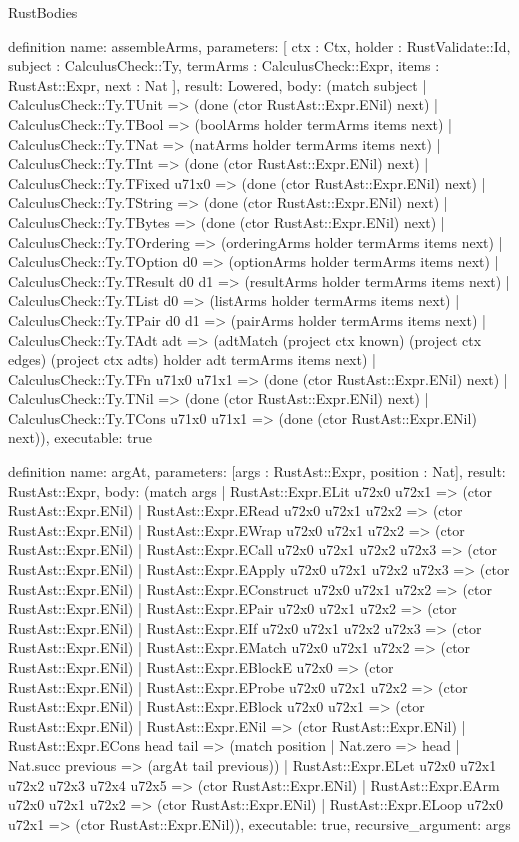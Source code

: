 \begin{lexlean}{RustBodies}
\begin{semanticmodule}
definition{
  name: assembleArms,
  parameters: [
    ctx : Ctx,
    holder : RustValidate::Id,
    subject : CalculusCheck::Ty,
    termArms : CalculusCheck::Expr,
    items : RustAst::Expr,
    next : Nat
  ],
  result: Lowered,
  body: (match subject
    | CalculusCheck::Ty.TUnit => (done (ctor RustAst::Expr.ENil) next)
    | CalculusCheck::Ty.TBool => (boolArms holder termArms items next)
    | CalculusCheck::Ty.TNat => (natArms holder termArms items next)
    | CalculusCheck::Ty.TInt => (done (ctor RustAst::Expr.ENil) next)
    | CalculusCheck::Ty.TFixed u71x0 => (done (ctor RustAst::Expr.ENil) next)
    | CalculusCheck::Ty.TString => (done (ctor RustAst::Expr.ENil) next)
    | CalculusCheck::Ty.TBytes => (done (ctor RustAst::Expr.ENil) next)
    | CalculusCheck::Ty.TOrdering => (orderingArms holder termArms items next)
    | CalculusCheck::Ty.TOption d0 => (optionArms holder termArms items next)
    | CalculusCheck::Ty.TResult d0 d1 => (resultArms holder termArms items next)
    | CalculusCheck::Ty.TList d0 => (listArms holder termArms items next)
    | CalculusCheck::Ty.TPair d0 d1 => (pairArms holder termArms items next)
    | CalculusCheck::Ty.TAdt adt => (adtMatch (project ctx known) (project ctx edges) (project ctx adts) holder adt termArms items next)
    | CalculusCheck::Ty.TFn u71x0 u71x1 => (done (ctor RustAst::Expr.ENil) next)
    | CalculusCheck::Ty.TNil => (done (ctor RustAst::Expr.ENil) next)
    | CalculusCheck::Ty.TCons u71x0 u71x1 => (done (ctor RustAst::Expr.ENil) next)),
  executable: true
}

definition{
  name: argAt,
  parameters: [args : RustAst::Expr, position : Nat],
  result: RustAst::Expr,
  body: (match args
    | RustAst::Expr.ELit u72x0 u72x1 => (ctor RustAst::Expr.ENil)
    | RustAst::Expr.ERead u72x0 u72x1 u72x2 => (ctor RustAst::Expr.ENil)
    | RustAst::Expr.EWrap u72x0 u72x1 u72x2 => (ctor RustAst::Expr.ENil)
    | RustAst::Expr.ECall u72x0 u72x1 u72x2 u72x3 => (ctor RustAst::Expr.ENil)
    | RustAst::Expr.EApply u72x0 u72x1 u72x2 u72x3 => (ctor RustAst::Expr.ENil)
    | RustAst::Expr.EConstruct u72x0 u72x1 u72x2 => (ctor RustAst::Expr.ENil)
    | RustAst::Expr.EPair u72x0 u72x1 u72x2 => (ctor RustAst::Expr.ENil)
    | RustAst::Expr.EIf u72x0 u72x1 u72x2 u72x3 => (ctor RustAst::Expr.ENil)
    | RustAst::Expr.EMatch u72x0 u72x1 u72x2 => (ctor RustAst::Expr.ENil)
    | RustAst::Expr.EBlockE u72x0 => (ctor RustAst::Expr.ENil)
    | RustAst::Expr.EProbe u72x0 u72x1 u72x2 => (ctor RustAst::Expr.ENil)
    | RustAst::Expr.EBlock u72x0 u72x1 => (ctor RustAst::Expr.ENil)
    | RustAst::Expr.ENil => (ctor RustAst::Expr.ENil)
    | RustAst::Expr.ECons head tail => (match position
      | Nat.zero => head
      | Nat.succ previous => (argAt tail previous))
    | RustAst::Expr.ELet u72x0 u72x1 u72x2 u72x3 u72x4 u72x5 => (ctor RustAst::Expr.ENil)
    | RustAst::Expr.EArm u72x0 u72x1 u72x2 => (ctor RustAst::Expr.ENil)
    | RustAst::Expr.ELoop u72x0 u72x1 => (ctor RustAst::Expr.ENil)),
  executable: true,
  recursive_argument: args
}


\end{semanticmodule}
\end{lexlean}
